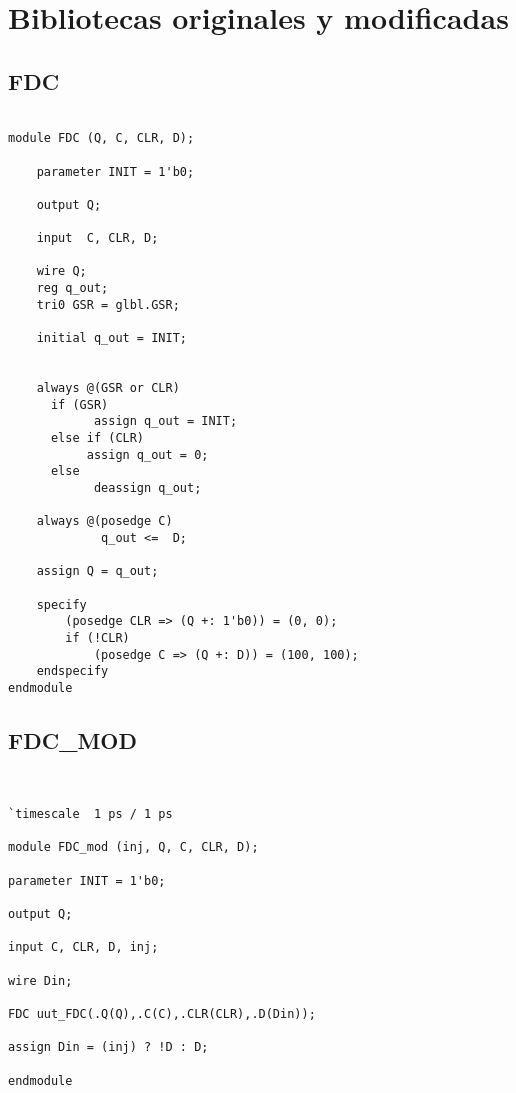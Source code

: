 
\chapter{Bibliotecas originales y modificadas }\label{aped.A}

\section{FDC}
\begin{lstlisting}

module FDC (Q, C, CLR, D);

    parameter INIT = 1'b0;

    output Q;

    input  C, CLR, D;

    wire Q;
    reg q_out;
    tri0 GSR = glbl.GSR;

    initial q_out = INIT;


    always @(GSR or CLR)
      if (GSR)
            assign q_out = INIT;
      else if (CLR)
           assign q_out = 0;
      else
            deassign q_out;

    always @(posedge C)
	         q_out <=  D;

    assign Q = q_out;

    specify
        (posedge CLR => (Q +: 1'b0)) = (0, 0);
        if (!CLR)
            (posedge C => (Q +: D)) = (100, 100);
    endspecify
endmodule
\end{lstlisting}

\section{FDC\_MOD}
\begin{lstlisting}


`timescale  1 ps / 1 ps

module FDC_mod (inj, Q, C, CLR, D);

parameter INIT = 1'b0;

output Q;

input C, CLR, D, inj;

wire Din;

FDC uut_FDC(.Q(Q),.C(C),.CLR(CLR),.D(Din));

assign Din = (inj) ? !D : D;

endmodule

\end{lstlisting}


